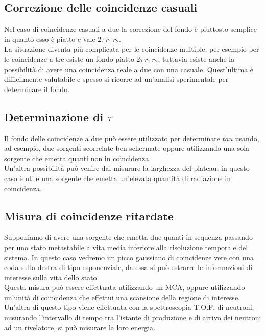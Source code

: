 \subsection{Correzione delle coincidenze casuali}
Nel caso di coincidenze casuali a due la correzione del fondo \`e piuttosto semplice in quanto esso \`e piatto e vale $2 \tau \, r_1 \, r_2$.\\
La situazione diventa pi\`u complicata per le coincidenze multiple, per esempio per le coincidenze a tre esiste un fondo piatto $2 \tau  \, r_1 \, r_2$,
tuttavia esiste anche la possibilit\`a di avere una coincidenza reale a due con una casuale. 
Quest'ultima \`e difficilmente valutabile e spesso si ricorre ad un'analisi sperimentale per determinare il fondo.
\subsection{Determinazione di $\tau$}
Il fondo delle coincidenze a due pu\`o essere utilizzato per determinare $tau$ usando, ad esempio, due sorgenti scorrelate ben schermate oppure utilizzando
una sola sorgente che emetta quanti non in coincidenza.\\
Un'altra possibilit\`a pu\`o venire dal misurare la larghezza del plateau, in questo caso \`e utile una sorgente che emetta un'elevata quantit\`a di 
radiazione in coincidenza.
\subsection{Misura di coincidenze ritardate}
Supponiamo di avere una sorgente che emetta due quanti in sequenza passando per uno stato metastabile a vita media inferiore alla risoluzione temporale del sistema.
In questo caso vedremo un picco gaussiano di coincidenze vere con una coda sulla destra di tipo esponenziale, da essa si pu\`o estrarre le informazioni di interesse sulla vita dello stato.\\
Questa misura pu\`o essere effettuata utilizzando un MCA, oppure utilizzando un'unit\`a di coincidenza che effettui una scansione della regione di interesse.\\
Un'altra di questo tipo viene effettuata con la spettroscopia T.O.F. di neutroni, misurando l'intervallo di tempo tra l'istante di produzione e di arrivo
dei neutroni ad un rivelatore, si pu\`o misurare la loro energia.
